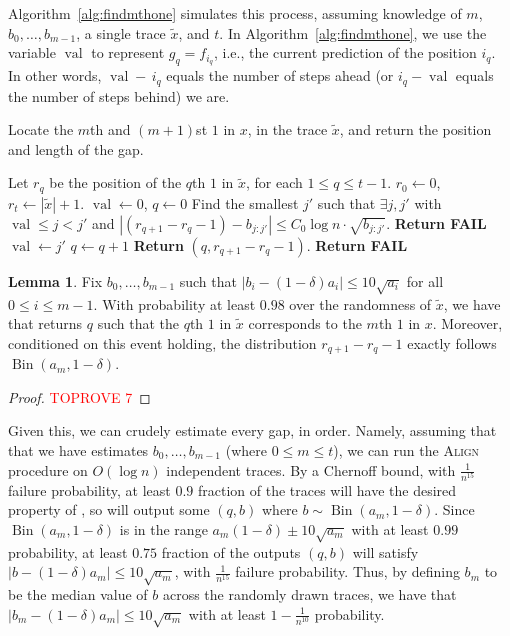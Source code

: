 \documentclass[12pt]{article}
\theoremstyle{definition}
\newtheorem{lemma}[theorem]{Lemma}
\theoremstyle{remark}
\DeclareMathOperator{\Bin}{Bin}
\DeclareMathOperator{\val}{val}
\begin{document}
Algorithm~\ref{alg:findmthone} simulates this process, assuming knowledge of $m$, $b_0, \dots, b_{m-1}$, a single trace $\tilde{x}$, and $t$. In Algorithm~\ref{alg:findmthone}, we use the variable $\val$ to represent $g_q = f_{i_q}$, i.e., the current prediction of the position $i_q$. In other words, $\val - \, i_q$ equals the number of steps ahead (or $i_q - \val$ equals the number of steps behind) we are. 

\begin{algorithm}
\caption{Locate the $m$th and $(m+1)$st $1$ in $x$, in the trace $\tilde{x}$, and return the position and length of the gap.}
\label{alg:findmthone}
\begin{algorithmic}[1]
\State Let $r_q$ be the position of the $q$th $1$ in $\tilde{x}$, for each $1 \le q \le t-1$.
\State $r_0 \leftarrow 0$, $r_t \leftarrow |\tilde{x}|+1$.
\State $\val \leftarrow 0$, $q \leftarrow 0$
\While{$\val < m$}
    \State Find the smallest $j'$ such that $\exists j, j'$ with $\val \le j < j'$ and $|(r_{q+1}-r_{q}-1) - b_{j:j'}| \le C_0 \log n \cdot \sqrt{b_{j:j'}}.$
        \State \textbf{Return FAIL}
    \EndIf
    \State $\val \leftarrow j'$
    \State $q \leftarrow q + 1$
    \EndWhile
\If{$\val = m$}
    \State \textbf{Return} $(q, r_{q+1}-r_{q}-1)$.
\Else
    \State \textbf{Return FAIL}
\EndIf
\EndProcedure
\end{algorithmic}
\end{algorithm}

\begin{lemma} \label{lem:crude-main-analysis}
    Fix $b_0, \dots, b_{m-1}$ such that $|b_i-(1-\delta) a_i| \le 10 \sqrt{a_i}$ for all $0 \le i \le m-1$. With probability at least $0.98$ over the randomness of $\tilde{x}$, we have that  returns $q$ such that the $q$th $1$ in $\tilde{x}$ corresponds to the $m$th $1$ in $x$. Moreover, conditioned on this event holding, the distribution $r_{q+1}-r_q-1$ exactly follows $\Bin(a_m, 1-\delta)$.
\end{lemma}

\begin{proof}\textcolor{red}{TOPROVE 7}\end{proof}

Given this, we can crudely estimate every gap, in order. Namely, assuming that that we have estimates $b_0, \dots, b_{m-1}$ (where $0 \le m \le t$), we can run the \textsc{Align} procedure on $O(\log n)$ independent traces. By a Chernoff bound, with $\frac{1}{n^{15}}$ failure probability, at least $0.9$ fraction of the traces will have the desired property of , so will output some $(q, b)$ where $b \sim \Bin(a_m, 1-\delta)$. Since $\Bin(a_m, 1-\delta)$ is in the range $a_m(1-\delta) \pm 10 \sqrt{a_m}$ with at least $0.99$ probability, at least $0.75$ fraction of the outputs $(q, b)$ will satisfy $|b - (1-\delta) a_m| \le 10 \sqrt{a_m}$, with $\frac{1}{n^{15}}$ failure probability. Thus, by defining $b_m$ to be the median value of $b$ across the randomly drawn traces, we have that $|b_m-(1-\delta) a_m| \le 10 \sqrt{a_m}$ with at least $1 - \frac{1}{n^{10}}$ probability.
\end{document}
